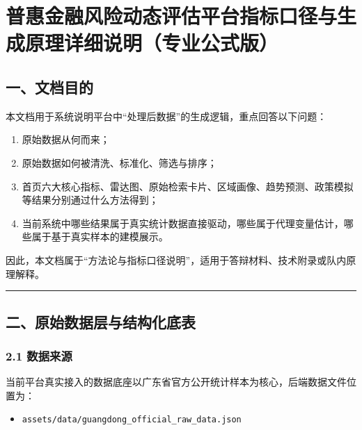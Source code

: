 \documentclass[
]{article}
\author{}
\date{}
\providecommand{\tightlist}{%
  \setlength{\itemsep}{0pt}\setlength{\parskip}{0pt}}
\begin{document}
\section{普惠金融风险动态评估平台指标口径与生成原理详细说明（专业公式版）}\label{ux666eux60e0ux91d1ux878dux98ceux9669ux52a8ux6001ux8bc4ux4f30ux5e73ux53f0ux6307ux6807ux53e3ux5f84ux4e0eux751fux6210ux539fux7406ux8be6ux7ec6ux8bf4ux660eux4e13ux4e1aux516cux5f0fux7248}

\subsection{一、文档目的}\label{ux4e00ux6587ux6863ux76eeux7684}

本文档用于系统说明平台中``处理后数据''的生成逻辑，重点回答以下问题：

\begin{enumerate}
\def\labelenumi{\arabic{enumi}.}
\tightlist
\item
  原始数据从何而来；
\item
  原始数据如何被清洗、标准化、筛选与排序；
\item
  首页六大核心指标、雷达图、原始检索卡片、区域画像、趋势预测、政策模拟等结果分别通过什么方法得到；
\item
  当前系统中哪些结果属于真实统计数据直接驱动，哪些属于代理变量估计，哪些属于基于真实样本的建模展示。
\end{enumerate}

因此，本文档属于``方法论与指标口径说明''，适用于答辩材料、技术附录或队内原理解释。

\begin{center}\rule{0.5\linewidth}{0.5pt}\end{center}

\subsection{二、原始数据层与结构化底表}\label{ux4e8cux539fux59cbux6570ux636eux5c42ux4e0eux7ed3ux6784ux5316ux5e95ux8868}

\subsubsection{2.1 数据来源}\label{ux6570ux636eux6765ux6e90}

当前平台真实接入的数据底座以广东省官方公开统计样本为核心，后端数据文件位置为：

\begin{itemize}
\tightlist
\item
  \texttt{assets/data/guangdong\_official\_raw\_data.json}
\end{itemize}
\end{document}
